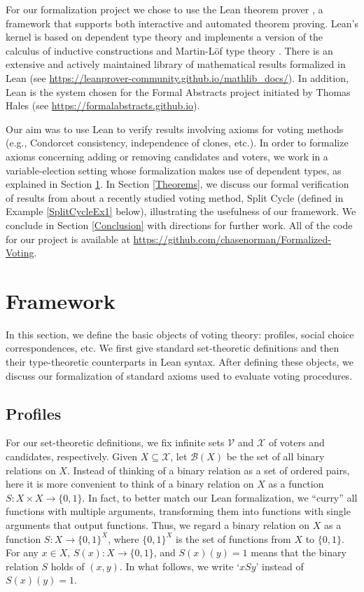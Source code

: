 \documentclass[runningheads]{llncs}
\begin{document}
For our formalization project we chose to use the Lean theorem prover \cite{Lean}, a framework that supports both interactive and automated theorem proving.   Lean's kernel is based on dependent type theory and   implements a version of the calculus of inductive constructions \cite{Coquand1988}  and Martin-L\"of type theory \cite{MartinLof1984}. There is an extensive and actively maintained  library of mathematical results formalized in Lean (see \url{https://leanprover-community.github.io/mathlib_docs/}). In addition, Lean is the system chosen for the Formal Abstracts project initiated by Thomas Hales (see \url{https://formalabstracts.github.io}). 
 
Our aim was to use Lean to verify results involving axioms for voting methods (e.g., Condorcet consistency, independence of clones, etc.). In order to formalize axioms concerning adding or removing candidates and voters, we work in a variable-election setting whose formalization makes use of dependent types, as explained in Section \ref{Framework}.  In Section \ref{Theorems}, we discuss our formal verification of results from \cite{HP2020b} about a recently studied voting method, Split Cycle (defined in Example \ref{SplitCycleEx1} below), illustrating the usefulness  of our  framework. We conclude in Section \ref{Conclusion} with directions for further work. All of the code for our project is available at \url{https://github.com/chasenorman/Formalized-Voting}.
 
\section{Framework}\label{Framework}

In this section, we define the basic objects of voting theory: profiles, social choice correspondences, etc. We first give standard set-theoretic definitions and then their type-theoretic counterparts in Lean syntax. After defining these objects, we discuss our formalization of standard axioms used to evaluate voting procedures.

\subsection{Profiles}

For our set-theoretic definitions, we fix infinite sets $\mathcal{V}$ and $\mathcal{X}$ of voters and candidates, respectively. Given $X\subseteq\mathcal{X}$, let $\mathcal{B}(X)$ be the set of all binary relations on $X$. Instead of thinking of a binary relation as a set of ordered pairs, here it is more convenient to think of a binary relation on $X$ as a function $S: X\times X \to \{0,1\}$. In fact, to better match our Lean formalization, we ``curry'' all functions with multiple arguments, transforming them into functions with single arguments that output functions. Thus, we regard a binary relation on $X$ as a function  $S:X\to \{0,1\}^X$, where $\{0,1\}^X$ is the set of functions from $X$ to $\{0,1\}$. For any $x\in X$, $S(x): X\to \{0,1\}$, and $S(x)(y)=1$ means that the binary relation $S$ holds of $(x,y)$. In what follows, we write `$xSy$' instead of $S(x)(y)=1$.
\end{document}
